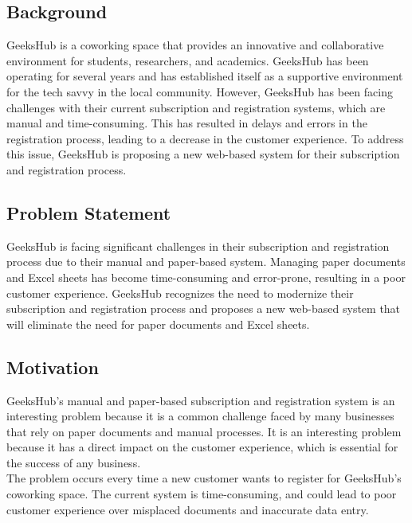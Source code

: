 \documentclass[hidelinks,a4paper,12pt]{article}
\begin{document}
\subsection{Background}
GeeksHub is a coworking space that provides an innovative and collaborative environment for students, researchers, and academics. GeeksHub has been operating for several years and has established itself as a supportive environment for the tech savvy in the local community. However, GeeksHub has been facing challenges with their current subscription and registration systems, which are manual and time-consuming. This has resulted in delays and errors in the registration process, leading to a decrease in the customer experience. To address this issue, GeeksHub is proposing a new web-based system for their subscription and registration process.\\

\subsection{Problem Statement}
GeeksHub is facing significant challenges in their subscription and registration process due to their manual and paper-based system. Managing paper documents and Excel sheets has become time-consuming and error-prone, resulting in a poor customer experience. GeeksHub recognizes the need to modernize their subscription and registration process and proposes a new web-based system that will eliminate the need for paper documents and Excel sheets.\\


\subsection{Motivation}

GeeksHub's manual and paper-based subscription and registration system is an interesting problem because it is a common challenge faced by many businesses that rely on paper documents and manual processes. It is an interesting problem because it has a direct impact on the customer experience, which is essential for the success of any business.\\


The problem occurs every time a new customer wants to register for GeeksHub's coworking space. The current system is time-consuming, and could lead to poor customer experience over misplaced documents and inaccurate data entry.\\
\end{document}
